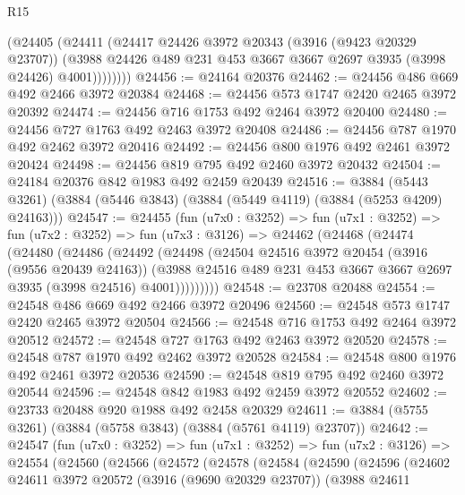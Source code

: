 \begin{lexlean}{R15}
\begin{coremodule}
            (@24405
              (@24411
                (@24417
                  @24426
                  @3972
                  @20343
                  (@3916 (@9423 @20329 @23707))
                  (@3988 @24426 @489 @231 @453 @3667 @3667 @2697 @3935 (@3998 @24426) @4001))))))))
@24456 := @24164 @20376
@24462 := @24456 @486 @669 @492 @2466 @3972 @20384
@24468 := @24456 @573 @1747 @2420 @2465 @3972 @20392
@24474 := @24456 @716 @1753 @492 @2464 @3972 @20400
@24480 := @24456 @727 @1763 @492 @2463 @3972 @20408
@24486 := @24456 @787 @1970 @492 @2462 @3972 @20416
@24492 := @24456 @800 @1976 @492 @2461 @3972 @20424
@24498 := @24456 @819 @795 @492 @2460 @3972 @20432
@24504 := @24184 @20376 @842 @1983 @492 @2459 @20439
@24516 := @3884
    (@5443 @3261)
    (@3884 (@5446 @3843) (@3884 (@5449 @4119) (@3884 (@5253 @4209) @24163)))
@24547 := @24455
    (fun (u7x0 : @3252) =>
    fun (u7x1 : @3252) =>
    fun (u7x2 : @3252) =>
    fun (u7x3 : @3126) =>
    @24462
      (@24468
        (@24474
          (@24480
            (@24486
              (@24492
                (@24498
                  (@24504
                    @24516
                    @3972
                    @20454
                    (@3916 (@9556 @20439 @24163))
                    (@3988
                      @24516
                      @489
                      @231
                      @453
                      @3667
                      @3667
                      @2697
                      @3935
                      (@3998 @24516)
                      @4001)))))))))
@24548 := @23708 @20488
@24554 := @24548 @486 @669 @492 @2466 @3972 @20496
@24560 := @24548 @573 @1747 @2420 @2465 @3972 @20504
@24566 := @24548 @716 @1753 @492 @2464 @3972 @20512
@24572 := @24548 @727 @1763 @492 @2463 @3972 @20520
@24578 := @24548 @787 @1970 @492 @2462 @3972 @20528
@24584 := @24548 @800 @1976 @492 @2461 @3972 @20536
@24590 := @24548 @819 @795 @492 @2460 @3972 @20544
@24596 := @24548 @842 @1983 @492 @2459 @3972 @20552
@24602 := @23733 @20488 @920 @1988 @492 @2458 @20329
@24611 := @3884 (@5755 @3261) (@3884 (@5758 @3843) (@3884 (@5761 @4119) @23707))
@24642 := @24547
    (fun (u7x0 : @3252) =>
    fun (u7x1 : @3252) =>
    fun (u7x2 : @3126) =>
    @24554
      (@24560
        (@24566
          (@24572
            (@24578
              (@24584
                (@24590
                  (@24596
                    (@24602
                      @24611
                      @3972
                      @20572
                      (@3916 (@9690 @20329 @23707))
                      (@3988
                        @24611

\end{coremodule}
\end{lexlean}
